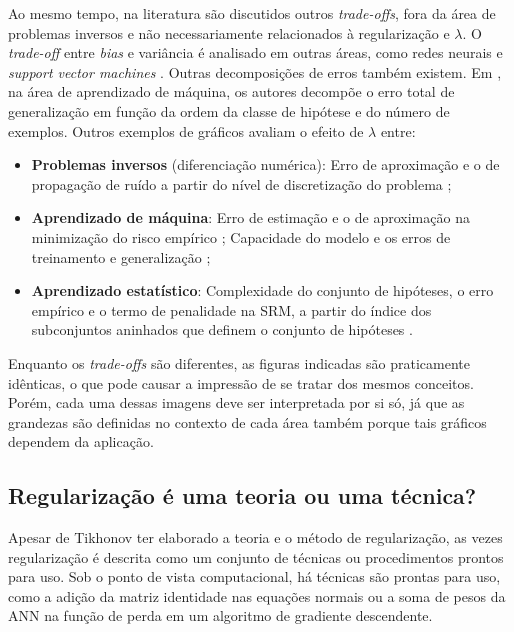    Ao mesmo tempo, na literatura são discutidos outros \textit{trade-offs}, fora da área de problemas inversos e não necessariamente relacionados à regularização e $\lambda$. O \textit{trade-off} entre \textit{bias} e variância é analisado em outras áreas, como redes neurais \cite{Geman1992} e \textit{support vector machines} \cite{James2013}. Outras decomposições de erros também existem. Em  \cite{Niyogi1999}, na área de aprendizado de máquina, os autores decompõe o erro total de generalização em função da ordem da classe de hipótese e do número de exemplos. Outros exemplos de gráficos avaliam o efeito de $\lambda$ entre:    
   \begin{itemize}
  \item  \textbf{Problemas inversos} (diferenciação numérica):  Erro de aproximação e o de propagação de ruído a partir do nível de discretização do problema \cite[Figura 1.7]{bleyer2015novel};
  
 \item \textbf{Aprendizado de máquina}: Erro de estimação e o de aproximação na minimização do risco empírico \cite[Figura 4.3]{Mohri2018}; Capacidade do modelo e os erros de treinamento e generalização \cite[Figura 5.3]{goodfellow2016deep};
 \item  \textbf{Aprendizado estatístico}: Complexidade do conjunto de hipóteses, o erro empírico e o termo de penalidade na SRM, a partir do índice dos subconjuntos aninhados que definem o conjunto de hipóteses \cite[Figura 4.4]{Mohri2018}.

\end{itemize}
Enquanto os \textit{trade-offs} são diferentes, as figuras indicadas são praticamente idênticas, o que pode causar a impressão de se tratar dos mesmos conceitos. Porém, cada uma dessas imagens deve ser interpretada por si só, já que as grandezas são definidas no contexto de cada área também porque tais gráficos dependem da aplicação. 



\subsection{Regularização é uma teoria ou uma técnica?}

Apesar de Tikhonov ter elaborado a teoria e o método de regularização, as vezes regularização é descrita como um conjunto de técnicas ou procedimentos prontos para uso. Sob o ponto de vista computacional, há técnicas são prontas para uso, como a adição da matriz identidade nas equações normais ou a soma de pesos da ANN na função de perda em um algoritmo de gradiente descendente.

